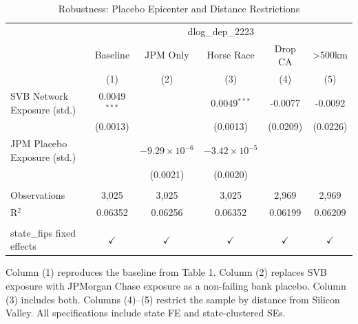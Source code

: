 \begin{table}[htbp]
   \caption{\label{tab:robust} Robustness: Placebo Epicenter and Distance Restrictions}
   \bigskip
   \centering
   \footnotesize\begin{tabular}{lccccc}
      \toprule
       & \multicolumn{5}{c}{dlog\_dep\_2223}\\
                                  & Baseline       & JPM Only               & Horse Race             & Drop CA       & >500km \\   
                                  & (1)            & (2)                    & (3)                    & (4)           & (5)\\  
      \midrule 
      SVB Network Exposure (std.) & 0.0049$^{***}$ &                        & 0.0049$^{***}$         & -0.0077       & -0.0092\\   
                                  & (0.0013)       &                        & (0.0013)               & (0.0209)      & (0.0226)\\   
      JPM Placebo Exposure (std.) &                & $-9.29\times 10^{-6}$  & $-3.42\times 10^{-5}$  &               &   \\   
                                  &                & (0.0021)               & (0.0020)               &               &   \\   
       \\
      Observations                & 3,025          & 3,025                  & 3,025                  & 2,969         & 2,969\\  
      R$^2$                       & 0.06352        & 0.06256                & 0.06352                & 0.06199       & 0.06209\\  
       \\
      state\_fips fixed effects   & $\checkmark$   & $\checkmark$           & $\checkmark$           & $\checkmark$  & $\checkmark$\\   
      \bottomrule
   \end{tabular}
   
   \par \raggedright 
   Column (1) reproduces the baseline from Table 1. Column (2) replaces SVB exposure with JPMorgan Chase exposure as a non-failing bank placebo. Column (3) includes both. Columns (4)--(5) restrict the sample by distance from Silicon Valley. All specifications include state FE and state-clustered SEs.
\end{table}
